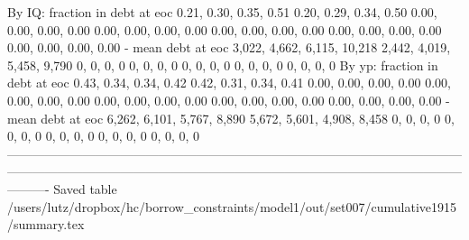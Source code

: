         By IQ: fraction in debt at eoc       0.21, 0.30, 0.35, 0.51      0.20, 0.29, 0.34, 0.50   0.00, 0.00, 0.00, 0.00    0.00, 0.00, 0.00, 0.00    0.00, 0.00, 0.00, 0.00      0.00, 0.00, 0.00, 0.00    0.00, 0.00, 0.00, 0.00
                    - mean debt at eoc  3,022, 4,662, 6,115, 10,218  2,442, 4,019, 5,458, 9,790               0, 0, 0, 0                0, 0, 0, 0                0, 0, 0, 0                  0, 0, 0, 0                0, 0, 0, 0
        By yp: fraction in debt at eoc       0.43, 0.34, 0.34, 0.42      0.42, 0.31, 0.34, 0.41   0.00, 0.00, 0.00, 0.00    0.00, 0.00, 0.00, 0.00    0.00, 0.00, 0.00, 0.00      0.00, 0.00, 0.00, 0.00    0.00, 0.00, 0.00, 0.00
                    - mean debt at eoc   6,262, 6,101, 5,767, 8,890  5,672, 5,601, 4,908, 8,458               0, 0, 0, 0                0, 0, 0, 0                0, 0, 0, 0                  0, 0, 0, 0                0, 0, 0, 0
----------------------------------------------------------------------------------------------------------------------------------------------------------------------------------------------------------------------------------
Saved table  /users/lutz/dropbox/hc/borrow_constraints/model1/out/set007/cumulative1915/summary.tex 
